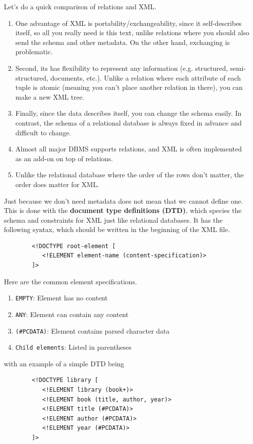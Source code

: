 \documentclass{article}
\begin{document}
    Let's do a quick comparison of relations and XML. 
    \begin{enumerate}
      \item One advantage of XML is portability/exchangeability, since it self-describes itself, so all you really need is this text, unlike relations where you should also send the schema and other metadata. On the other hand, exchanging is problematic. 
      \item Second, its has flexibility to represent any information (e.g. structured, semi-structured, documents, etc.). Unlike a relation where each attribute of each tuple is atomic (meaning you can't place another relation in there), you can make a new XML tree. 
      \item Finally, since the data describes itself, you can change the schema easily. In contrast, the schema of a relational database is always fixed in advance and difficult to change. 
      \item Almost all major DBMS supports relations, and XML is often implemented as an add-on on top of relations. 
      \item Unlike the relational database where the order of the rows don't matter, the order does matter for XML. 
    \end{enumerate}
    
    \begin{definition}[DTD]
      Just because we don't need metadata does not mean that we cannot define one. This is done with the \textbf{document type definitions (DTD)}, which species the schema and constraints for XML just like relational databases. It has the following syntax, which should be written in the beginning of the XML file. 
      \begin{lstlisting}
        <!DOCTYPE root-element [
           <!ELEMENT element-name (content-specification)>
        ]> 
      \end{lstlisting} 
      Here are the common element specifications. 
      \begin{enumerate}
        \item \texttt{EMPTY}: Element has no content
        \item \texttt{ANY}: Element can contain any content
        \item \texttt{(\#PCDATA)}: Element contains parsed character data
        \item \texttt{Child elements}: Listed in parentheses
      \end{enumerate}
      with an example of a simple DTD being 
      \begin{lstlisting}
        <!DOCTYPE library [
           <!ELEMENT library (book+)>
           <!ELEMENT book (title, author, year)>
           <!ELEMENT title (#PCDATA)>
           <!ELEMENT author (#PCDATA)>
           <!ELEMENT year (#PCDATA)>
        ]> 
      \end{lstlisting}
    \end{definition}
\end{document}
